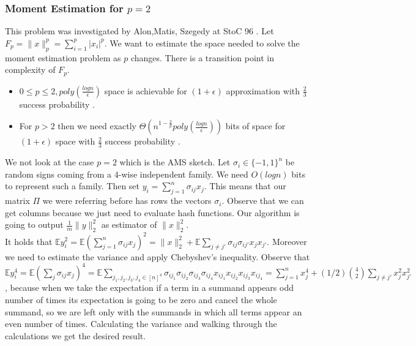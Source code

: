\documentclass[11pt]{article}
\begin{document}
\subsubsection{Moment Estimation for $p=2$}

This problem was investigated by Alon,Matis, Szegedy at StoC 96 \cite{AlonMS99}. Let $F_p = \| x \|_p^p = \sum_{i=1}^p |x_i|^p$. We want to estimate the space needed to solve the moment estimation problem as $p$ changes. There is a transition point in complexity of $F_p$.

\begin{itemize} 

\item $0 \leq p \leq 2, poly(\frac{logn}{\epsilon})$ space is achievable for $(1+\epsilon)$ approximation with $\frac{2}{3}$ success probability \cite{AlonMS99,Indyk06}.
\item For $p >2$ then we need exactly $\Theta(n^{1-\frac{2}{p}} poly(\frac{logn}{\epsilon}))$ bits of space for $(1+\epsilon)$ space with $\frac{2}{3}$ success probability \cite{BarYossefJKS04,IndykW05}.
\end{itemize}

We not look at the case $p=2$ which is the AMS sketch. Let $\sigma_i \in \{-1,1\}^n$ be random signs coming from a $4$-wise independent family. We need $O(logn)$ bits to represent such a family. Then set $y_i= \sum_{j=1}^n \sigma_{ij} x_{j}$. This means that our matrix $\Pi$ we were referring before has rows the vectors $\sigma_i$. Observe that we can get columns because we just need to evaluate hash functions. Our algorithm is going to output $\frac{1}{m} \|y\|_2^2$ as estimator of $\|x\|_2^2$.\\

It holds that $\mathbb{E} y_i^2 = \mathbb{E} (\sum_{j=1}^n \sigma_{ij} x_j)^2  = \|x\|_2^2 + \mathbb{E}\sum_{j \neq j'} \sigma_{ij} \sigma_{ij'} x_{j}x_{j'}$.
Moreover we need to estimate the variance and apply Chebyshev's inequality. Observe that $\mathbb{E} y_i^4 = \mathbb{E} ( \sum_j \sigma_{ij}x_j )^4 = \mathbb{E} \sum_{j_1,j_2,j_3,j_4 \in [n]^4} \sigma_{ij_1} \sigma_{ij_2} \sigma_{ij_3} \sigma_{ij_4}x_{ij_1} x_{ij_2} x_{ij_3} x_{ij_4}  = \sum_{j=1}^n x_j^4 + (1/2){4 \choose 2} \sum_{j \neq j'} x_j^2 x_{j'}^2$, because when we take the expectation if a term in a summand appears odd number of times its expectation is going to be zero and cancel the whole summand, so we are left only with  the summands in which all terms appear an even number of  times. Calculating the variance and walking through the calculations we get the desired result.\\
\end{document}
